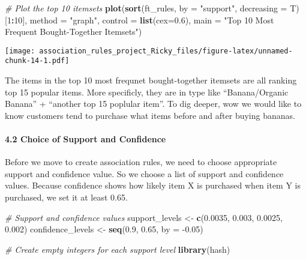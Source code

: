 \documentclass[]{article}
\newenvironment{Shaded}{\begin{snugshade}}{\end{snugshade}}
\newcommand{\CommentTok}[1]{\textcolor[rgb]{0.56,0.35,0.01}{\textit{#1}}}
\newcommand{\DataTypeTok}[1]{\textcolor[rgb]{0.13,0.29,0.53}{#1}}
\newcommand{\DecValTok}[1]{\textcolor[rgb]{0.00,0.00,0.81}{#1}}
\newcommand{\FloatTok}[1]{\textcolor[rgb]{0.00,0.00,0.81}{#1}}
\newcommand{\KeywordTok}[1]{\textcolor[rgb]{0.13,0.29,0.53}{\textbf{#1}}}
\newcommand{\NormalTok}[1]{#1}
\newcommand{\OperatorTok}[1]{\textcolor[rgb]{0.81,0.36,0.00}{\textbf{#1}}}
\newcommand{\StringTok}[1]{\textcolor[rgb]{0.31,0.60,0.02}{#1}}
\let\oldparagraph\paragraph
\renewcommand{\paragraph}[1]{\oldparagraph{#1}\mbox{}}
\begin{document}
\begin{Shaded}
\begin{Highlighting}[]
\CommentTok{# Plot the top 10 itemsets}
\KeywordTok{plot}\NormalTok{(}\KeywordTok{sort}\NormalTok{(ft_rules, }\DataTypeTok{by =} \StringTok{"support"}\NormalTok{, }\DataTypeTok{decreasing =}\NormalTok{ T)[}\DecValTok{1}\OperatorTok{:}\DecValTok{10}\NormalTok{], }\DataTypeTok{method =} \StringTok{"graph"}\NormalTok{, }\DataTypeTok{control =} \KeywordTok{list}\NormalTok{(}\DataTypeTok{cex=}\FloatTok{0.6}\NormalTok{), }\DataTypeTok{main =} \StringTok{"Top 10 Most Frequent Bought-Together Itemsets"}\NormalTok{)}
\end{Highlighting}
\end{Shaded}

\texttt{[image: association\_rules\_project\_Ricky\_files/figure-latex/unnamed-chunk-14-1.pdf]}

The items in the top 10 most frequnet bought-together itemsets are all
ranking top 15 popular items. More specificly, they are in type like
``Banana/Organic Banana'' + ``another top 15 poplular item''. To dig
deeper, wow we would like to know customers tend to purchase what items
before and after buying bananas.

\hypertarget{choice-of-support-and-confidence}{%
\paragraph{4.2 Choice of Support and
Confidence}\label{choice-of-support-and-confidence}}

Before we move to create association rules, we need to choose
appropriate support and confidence value. So we choose a list of support
and confidence values. Because confidence shows how likely item X is
purchased when item Y is purchased, we set it at least 0.65.

\begin{Shaded}
\begin{Highlighting}[]
\CommentTok{# Support and confidence values}
\NormalTok{support_levels <-}\StringTok{ }\KeywordTok{c}\NormalTok{(}\FloatTok{0.0035}\NormalTok{, }\FloatTok{0.003}\NormalTok{, }\FloatTok{0.0025}\NormalTok{, }\FloatTok{0.002}\NormalTok{)}
\NormalTok{confidence_levels <-}\StringTok{ }\KeywordTok{seq}\NormalTok{(}\FloatTok{0.9}\NormalTok{, }\FloatTok{0.65}\NormalTok{, }\DataTypeTok{by =} \FloatTok{-0.05}\NormalTok{)}

\CommentTok{# Create empty integers for each support level}
\KeywordTok{library}\NormalTok{(hash)}
\end{Highlighting}
\end{Shaded}
\end{document}
